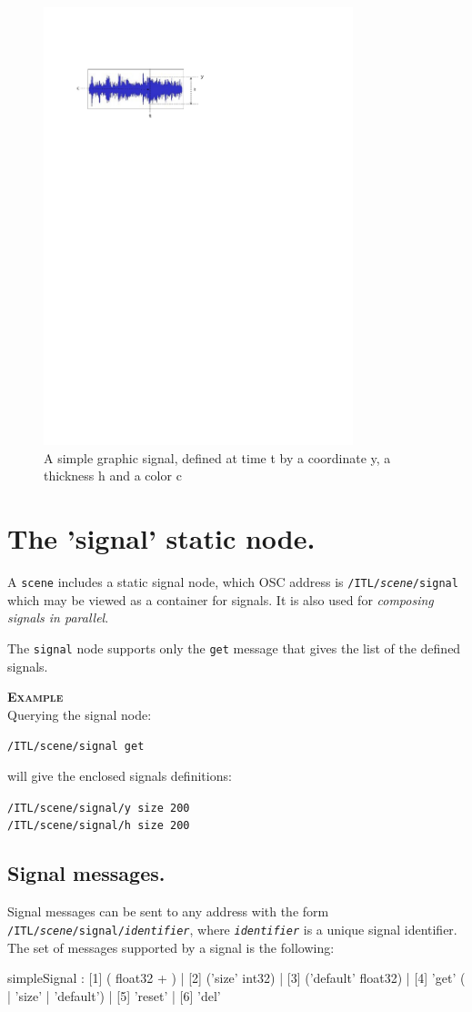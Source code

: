 \documentclass[a4paper,twoside]{report}
\newcommand{\sublevel}[1]	{\section{#1}}
\newcommand{\subsublevel}[1]	{\subsection{#1}}
\newcommand{\OSC}[1]		{\texttt{#1}}
\newcommand{\example}		{\textbf{\hspace{-1.5cm}\textbf{\textsc{Example }}}}
\newcommand{\sample}	[1]			{\vspace{-2mm}\begin{center}\colorbox{mygrey}{
								\begin{minipage}[t]{0.9\columnwidth} 
								{\small \texttt{#1}}
								\end{minipage}}\end{center}}
\newcommand{\sampleindent}	{ \hspace{0.5cm} }
\begin{document}
\begin{figure}[h]
	\centering \includegraphics[width=90mm]{imgs/graph}
 \caption{A simple graphic signal, defined at time t by a coordinate y, a thickness h and a color c}
 \label{graphimg}
\end{figure}

\sublevel{The 'signal' static node.}
A \OSC{scene} includes a static signal node, which OSC address is \OSC{/ITL/\textit{scene}/signal} which may be viewed as a container for signals. It is also used for \textit{composing signals in parallel}.

The \OSC{signal} node supports only the \OSC{get} message that gives the list of the defined signals.

\example \\
Querying the signal node:
\sample{/ITL/scene/signal get}
\sampleindent will give the enclosed signals definitions:
\sample{/ITL/scene/signal/y size 200 \\
/ITL/scene/signal/h size 200
}


\subsublevel{Signal messages.}
\label{ssignal}
Signal messages can be sent to any address with the form \OSC{/ITL/\textit{scene}/signal/\textit{identifier}}, where \OSC{\textit{identifier}} is a unique signal identifier.
The set of messages supported by a signal is the following:
\begin{rail}
simpleSignal : [1] ( float32 + )
		| [2] ('size' int32) 
		| [3] ('default' float32)
		| [4] 'get' ( | 'size' | 'default')
		| [5] 'reset'
		| [6] 'del'
\end{rail}
\end{document}
